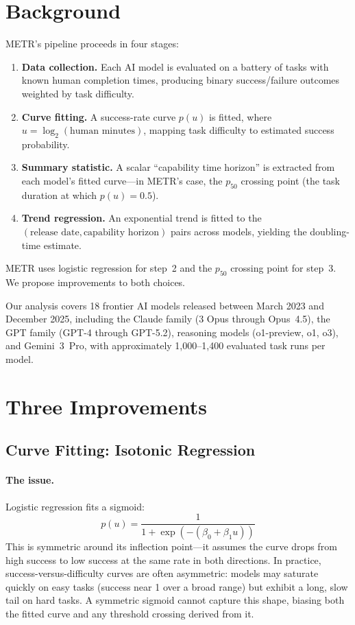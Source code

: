 \documentclass[11pt,a4paper]{article}
\begin{document}
\section{Background}
\label{sec:background}

METR's pipeline proceeds in four stages:
\begin{enumerate}
  \item \textbf{Data collection.} Each AI model is evaluated on a battery of tasks with known human completion times, producing binary success/failure outcomes weighted by task difficulty.
  \item \textbf{Curve fitting.} A success-rate curve $p(u)$ is fitted, where $u = \log_2(\text{human minutes})$, mapping task difficulty to estimated success probability.
  \item \textbf{Summary statistic.} A scalar ``capability time horizon'' is extracted from each model's fitted curve---in METR's case, the $p_{50}$ crossing point (the task duration at which $p(u) = 0.5$).
  \item \textbf{Trend regression.} An exponential trend is fitted to the $(\text{release date}, \text{capability horizon})$ pairs across models, yielding the doubling-time estimate.
\end{enumerate}

METR uses logistic regression for step~2 and the $p_{50}$ crossing point for step~3.
We propose improvements to both choices.

Our analysis covers 18 frontier AI models released between March 2023 and December 2025, including the Claude family (3 Opus through Opus~4.5), the GPT family (GPT-4 through GPT-5.2), reasoning models (o1-preview, o1, o3), and Gemini~3~Pro, with approximately 1{,}000--1{,}400 evaluated task runs per model.


\section{Three Improvements}
\label{sec:improvements}

\subsection{Curve Fitting: Isotonic Regression}
\label{sec:isotonic}

\paragraph{The issue.}
Logistic regression fits a sigmoid:
\[
  p(u) = \frac{1}{1 + \exp(-(\beta_0 + \beta_1 u))}
\]
This is symmetric around its inflection point---it assumes the curve drops from high success to low success at the same rate in both directions.
In practice, success-versus-difficulty curves are often asymmetric: models may saturate quickly on easy tasks (success near 1 over a broad range) but exhibit a long, slow tail on hard tasks.
A symmetric sigmoid cannot capture this shape, biasing both the fitted curve and any threshold crossing derived from it.
\end{document}
